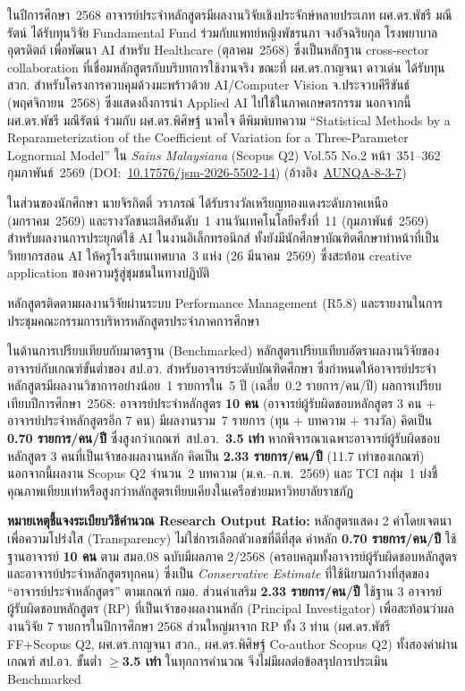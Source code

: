 ในปีการศึกษา~2568 อาจารย์ประจำหลักสูตรมีผลงานวิจัยเชิงประจักษ์หลายประเภท ผศ.ดร.พัชรี มณีรัตน์ ได้รับทุนวิจัย Fundamental Fund ร่วมกับแพทย์หญิงพัชรนภา จงอัจฉริยกุล โรงพยาบาลอุตรดิตถ์ เพื่อพัฒนา AI สำหรับ Healthcare (ตุลาคม~2568) ซึ่งเป็นหลักฐาน cross-sector collaboration ที่เชื่อมหลักสูตรกับบริบทการใช้งานจริง ขณะที่ ผศ.ดร.กาญจนา ดาวเด่น ได้รับทุน สวก. สำหรับโครงการควบคุมด้วงมะพร้าวด้วย AI/Computer Vision จ.ประจวบคีรีขันธ์ (พฤศจิกายน~2568) ซึ่งแสดงถึงการนำ Applied AI ไปใช้ในภาคเกษตรกรรม นอกจากนี้ ผศ.ดร.พัชรี มณีรัตน์ ร่วมกับ ผศ.ดร.พิศิษฐ์ นาคใจ ตีพิมพ์บทความ ``Statistical Methods by a Reparameterization of the Coefficient of Variation for a Three-Parameter Lognormal Model'' ใน \textit{Sains Malaysiana} (Scopus Q2) Vol.55 No.2 หน้า~351--362 กุมภาพันธ์~2569 (DOI:~\href{https://doi.org/10.17576/jsm-2026-5502-14}{10.17576/jsm-2026-5502-14}) (อ้างอิง~\hyperlink{ref:AUNQA-8-3-7}{AUNQA-8-3-7})

ในส่วนของนักศึกษา นายจิรกิตติ์ วราภรณ์ ได้รับรางวัลเหรียญทองแดงระดับภาคเหนือ (มกราคม~2569) และรางวัลชนะเลิศอันดับ~1 งานวันเทคโนโลยีครั้งที่~11 (กุมภาพันธ์~2569) สำหรับผลงานการประยุกต์ใช้ AI ในงานอิเล็กทรอนิกส์ ทั้งยังมีนักศึกษาบัณฑิตศึกษาทำหน้าที่เป็นวิทยากรสอน AI ให้ครูโรงเรียนเทศบาล~3 แห่ง (26 มีนาคม~2569) ซึ่งสะท้อน creative application ของความรู้สู่ชุมชนในทางปฏิบัติ

หลักสูตรติดตามผลงานวิจัยผ่านระบบ Performance Management (R5.8) และรายงานในการประชุมคณะกรรมการบริหารหลักสูตรประจำภาคการศึกษา

ในด้านการเปรียบเทียบกับมาตรฐาน (Benchmarked) หลักสูตรเปรียบเทียบอัตราผลงานวิจัยของอาจารย์กับเกณฑ์ขั้นต่ำของ สป.อว. สำหรับอาจารย์ระดับบัณฑิตศึกษา ซึ่งกำหนดให้อาจารย์ประจำหลักสูตรมีผลงานวิชาการอย่างน้อย~1 รายการใน~5 ปี (เฉลี่ย~0.2 รายการ/คน/ปี) ผลการเปรียบเทียบปีการศึกษา~2568: อาจารย์ประจำหลักสูตร \textbf{10 คน} (อาจารย์ผู้รับผิดชอบหลักสูตร 3 คน + อาจารย์ประจำหลักสูตรอีก 7 คน) มีผลงานรวม~7 รายการ (ทุน + บทความ + รางวัล) คิดเป็น \textbf{0.70 รายการ/คน/ปี} ซึ่งสูงกว่าเกณฑ์~สป.อว.~\textbf{3.5 เท่า} หากพิจารณาเฉพาะอาจารย์ผู้รับผิดชอบหลักสูตร 3 คนที่เป็นเจ้าของผลงานหลัก คิดเป็น \textbf{2.33 รายการ/คน/ปี} (11.7 เท่าของเกณฑ์) นอกจากนี้ผลงาน Scopus Q2 จำนวน~2 บทความ (ม.ค.--ก.พ.~2569) และ TCI กลุ่ม~1 บ่งชี้คุณภาพเทียบเท่าหรือสูงกว่าหลักสูตรเทียบเคียงในเครือข่ายมหาวิทยาลัยราชภัฏ

\textbf{หมายเหตุชี้แจงระเบียบวิธีคำนวณ Research Output Ratio:} หลักสูตรแสดง 2 ค่าโดยเจตนาเพื่อความโปร่งใส (Transparency) ไม่ใช่การเลือกตัวเลขที่ดีที่สุด ค่าหลัก \textbf{0.70 รายการ/คน/ปี} ใช้ฐานอาจารย์ \textbf{10 คน} ตาม สมอ.08 ฉบับมีผลภาค 2/2568 (ครอบคลุมทั้งอาจารย์ผู้รับผิดชอบหลักสูตรและอาจารย์ประจำหลักสูตรทุกคน) ซึ่งเป็น \textit{Conservative Estimate} ที่ใช้นิยามกว้างที่สุดของ ``อาจารย์ประจำหลักสูตร'' ตามเกณฑ์ กมอ. ส่วนค่าเสริม \textbf{2.33 รายการ/คน/ปี} ใช้ฐาน 3 อาจารย์ผู้รับผิดชอบหลักสูตร (RP) ที่เป็นเจ้าของผลงานหลัก (Principal Investigator) เพื่อสะท้อนว่าผลงานวิจัย 7 รายการในปีการศึกษา 2568 ส่วนใหญ่มาจาก RP ทั้ง 3 ท่าน (ผศ.ดร.พัชรี FF+Scopus Q2, ผศ.ดร.กาญจนา สวก., ผศ.ดร.พิศิษฐ์ Co-author Scopus Q2) ทั้งสองค่าผ่านเกณฑ์ สป.อว. ขั้นต่ำ \textbf{$\geq$3.5 เท่า} ในทุกการคำนวณ จึงไม่มีผลต่อข้อสรุปการประเมิน Benchmarked

